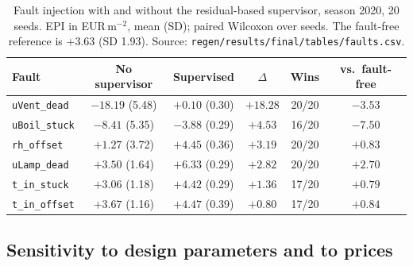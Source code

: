 \begin{table}[t]
\centering
\caption{Fault injection with and without the residual-based supervisor, season 2020, 20
seeds. EPI in EUR\,m$^{-2}$, mean (SD); paired Wilcoxon over seeds. The fault-free
reference is $+3.63$ (SD 1.93). Source: \texttt{regen/results/final/tables/faults.csv}.}
\label{tab:faults}
\small
\begin{tabular}{@{}lccccc@{}}
\toprule
Fault & No supervisor & Supervised & $\Delta$ & Wins & vs.\ fault-free \\
\midrule
\texttt{uVent\_dead}  & $-18.19$ (5.48) & $+0.10$ (0.30) & $+18.28$ & 20/20 & $-3.53$ \\
\texttt{uBoil\_stuck} & $-8.41$ (5.35)  & $-3.88$ (0.29) & $+4.53$  & 16/20 & $-7.50$ \\
\texttt{rh\_offset}   & $+1.27$ (3.72)  & $+4.45$ (0.36) & $+3.19$  & 20/20 & $+0.83$ \\
\texttt{uLamp\_dead}  & $+3.50$ (1.64)  & $+6.33$ (0.29) & $+2.82$  & 20/20 & $+2.70$ \\
\texttt{t\_in\_stuck} & $+3.06$ (1.18)  & $+4.42$ (0.29) & $+1.36$  & 17/20 & $+0.79$ \\
\texttt{t\_in\_offset}& $+3.67$ (1.16)  & $+4.47$ (0.39) & $+0.80$  & 17/20 & $+0.84$ \\
\bottomrule
\end{tabular}
\end{table}

\subsection{Sensitivity to design parameters and to prices}
\label{sec:res-sens}

